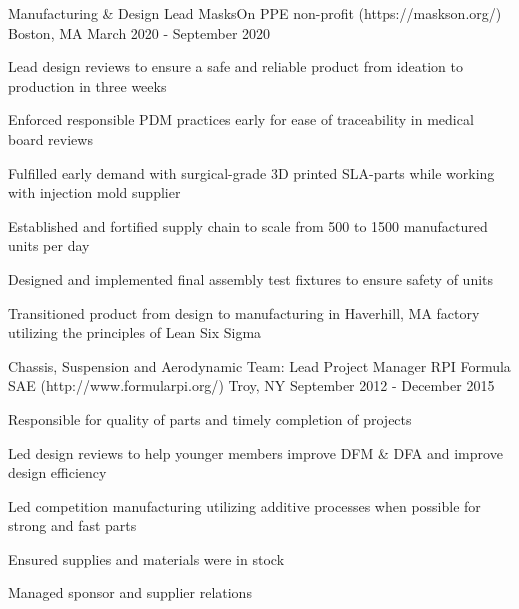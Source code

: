 

\begin{cventries}

    
  \cventry
    {Manufacturing \& Design Lead} %
    {MasksOn PPE non-profit ({\tiny https://maskson.org/})} %
    {Boston, MA} %
    {March 2020 - September 2020} %
    {
      \begin{cvitems} %
        \item{Lead design reviews to ensure a safe and reliable product from ideation to production in three weeks}
        \item{Enforced responsible PDM practices early for ease of traceability in medical board reviews}
        \item{Fulfilled early demand with surgical-grade 3D printed SLA-parts while working with injection mold supplier}
        \item{Established and fortified supply chain to scale from 500 to 1500 manufactured units per day}
        \item{Designed and implemented final assembly test fixtures to ensure safety of units}
        \item{Transitioned product from design to manufacturing in Haverhill, MA factory utilizing the principles of Lean Six Sigma}
      \end{cvitems}
    }

  \cventry
    {Chassis, Suspension and Aerodynamic Team: Lead Project Manager} %
    {RPI Formula SAE ({\tiny http://www.formularpi.org/})} %
    {Troy, NY} %
    {September 2012 - December 2015} %
    {
      \begin{cvitems} %
        \item{Responsible for quality of parts and timely completion of projects}
        \item{Led design reviews to help younger members improve DFM \& DFA and improve design efficiency}
        \item{Led competition manufacturing utilizing additive processes when possible for strong and fast parts}
        \item{Ensured supplies and materials were in stock}
        \item{Managed sponsor and supplier relations}
      \end{cvitems}
    }
    

\end{cventries}
